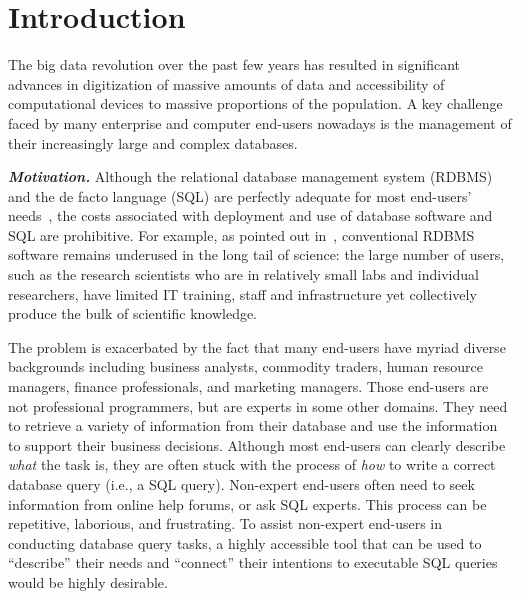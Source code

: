 \section{Introduction}
\label{sec:introduction}


The big data revolution over the past few years has resulted
in significant advances in digitization of massive amounts
of data and accessibility of computational devices to massive
proportions of the population. A key challenge faced by many
enterprise and computer end-users nowadays is the management
of their increasingly large and complex databases.




\vspace{1mm}
\noindent \textbf{\textit{Motivation.}}
Although the relational database management system (RDBMS) and the
de facto language (SQL) are perfectly adequate for most end-users'
needs~\cite{Howe:2011}, the costs associated with deployment and
use of database software and SQL are prohibitive. 
For example, as pointed out in~\cite{Gray:2005},
conventional RDBMS software remains underused
in the long tail of science: the large number of users, such as the
research scientists who are in relatively small labs and individual
researchers, have limited IT training, staff and infrastructure yet
collectively produce the bulk of scientific knowledge. 

The problem is exacerbated by the fact that many end-users
have myriad diverse backgrounds including 
business analysts, commodity traders, human resource managers,
finance professionals, and marketing managers. 
Those end-users are not professional programmers, but are experts in some
other domains. They need to retrieve a variety of information from their
database and use the information to support their business decisions.
Although most end-users can clearly describe \textit{what} the task is, they
are often stuck with the process of \textit{how} to
write a correct database query (i.e., a SQL query).
Non-expert end-users often need to
seek information from online help forums, or ask
SQL experts. This process can be repetitive, laborious, and frustrating.
To assist non-expert end-users in conducting database query tasks,
a highly accessible tool that can be used to ``describe''
their needs and ``connect'' their intentions to executable
SQL queries would be highly desirable.


